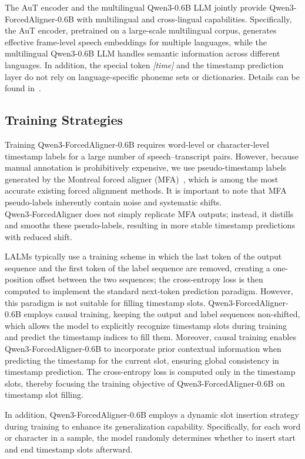 The AuT encoder and the multilingual Qwen3-0.6B LLM jointly provide Qwen3-ForcedAligner-0.6B with multilingual and cross-lingual capabilities. Specifically, the AuT encoder, pretrained on a large-scale multilingual corpus, generates effective frame-level speech embeddings for multiple languages, while the multilingual Qwen3-0.6B LLM handles semantic information across different languages. In addition, the special token \textit{[time]} and the timestamp prediction layer do not rely on language-specific phoneme sets or dictionaries. Details can be found in~\cite{llmfa}.
\subsection{Training Strategies}
Training Qwen3-ForcedAligner-0.6B requires word-level or character-level timestamp labels for a large number of speech–transcript pairs. However, because manual annotation is prohibitively expensive, we use pseudo-timestamp labels generated by the Montreal forced aligner (MFA)~\cite{mfa}, which is among the most accurate existing forced alignment methods. It is important to note that MFA pseudo-labels inherently contain noise and systematic shifts. Qwen3‑ForcedAligner does not simply replicate MFA outputs; instead, it distills and smooths these pseudo-labels, resulting in more stable timestamp predictions with reduced shift.

LALMs typically use a training scheme in which the last token of the output sequence and the first token of the label sequence are removed, creating a one-position offset between the two sequences; the cross-entropy loss is then computed to implement the standard next-token prediction paradigm. However, this paradigm is not suitable for filling timestamp slots. Qwen3-ForcedAligner-0.6B employs causal training, keeping the output and label sequences non-shifted, which allows the model to explicitly recognize timestamp slots during training and predict the timestamp indices to fill them. Moreover, causal training enables Qwen3-ForcedAligner-0.6B to incorporate prior contextual information when predicting the timestamp for the current slot, ensuring global consistency in timestamp prediction.
The cross-entropy loss is computed only in the timestamp slots, thereby focusing the training objective of Qwen3-ForcedAligner-0.6B on timestamp slot filling.

In addition, Qwen3-ForcedAligner-0.6B employs a dynamic slot insertion strategy during training to enhance its generalization capability. Specifically, for each word or character in a sample, the model randomly determines whether to insert start and end timestamp slots afterward.
